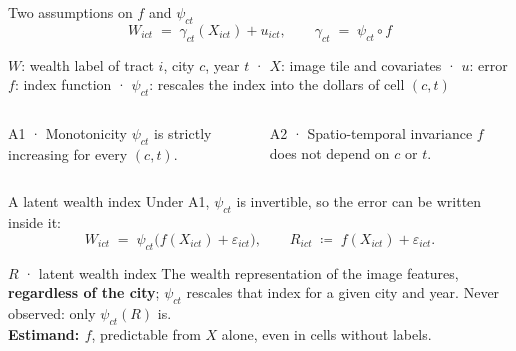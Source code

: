 \documentclass[10pt,aspectratio=169]{beamer}
\begin{document}
\begin{frame}{Two assumptions on $f$ and $\psi_{ct}$}
\[
  W_{ict} \;=\; \gamma_{ct}(X_{ict}) + u_{ict},
  \qquad
  \gamma_{ct} \;=\; \psi_{ct}\circ f
\]
{\footnotesize\centering
$W$: wealth label of tract $i$, city $c$, year $t$ \;·\; $X$: image tile and covariates \;·\; $u$: error\\[2pt]
$f$: index function \;·\; $\psi_{ct}$: rescales the index into the dollars of cell $(c,t)$\par}
\medskip
\begin{columns}[T]
\begin{tbox}[blue]{A1 · Monotonicity}
\footnotesize $\psi_{ct}$ is strictly increasing for every $(c,t)$.\\[1pt]
\end{tbox}
\begin{tbox}[blue]{A2 · Spatio-temporal invariance}
\footnotesize $f$ does not depend on $c$ or $t$.\\[1pt]
\end{tbox}
\end{columns}
\end{frame}

\begin{frame}{A latent wealth index}
\footnotesize Under A1, $\psi_{ct}$ is invertible, so the error can be written inside it:
\[
  W_{ict} \;=\; \psi_{ct}\big(f(X_{ict})+\varepsilon_{ict}\big),
  \qquad
  R_{ict} \;\coloneqq\; f(X_{ict})+\varepsilon_{ict}.
\]
{\centering\scriptsize{}\par}
\bigskip
\begin{tbox}[violet]{$R$ · latent wealth index}
\footnotesize The wealth representation of the image features, \textbf{regardless of the city}; $\psi_{ct}$ rescales that index for a given city and year. Never observed: only $\psi_{ct}(R)$ is.\\[3pt]
\textbf{Estimand: $f$}, predictable from $X$ alone, even in cells without labels.
\end{tbox}
\end{frame}
\end{document}
